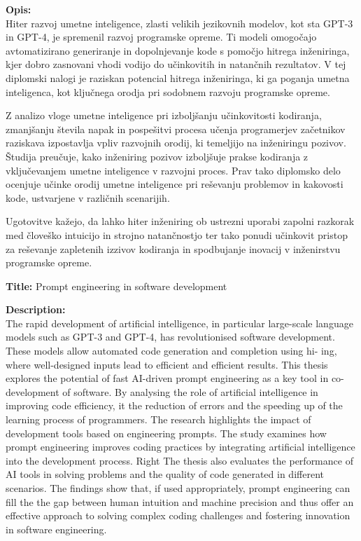 \documentclass[a4paper,12pt,openright]{book}
\newcommand{\ttitleEn}{Prompt engineering in software development}
\begin{document}
\bigskip
\noindent\textbf{Opis:}\\
Hiter razvoj umetne inteligence, zlasti velikih jezikovnih modelov, kot sta GPT-3 in GPT-4, je spremenil razvoj programske opreme. Ti modeli omogočajo avtomatizirano generiranje in dopolnjevanje kode s pomočjo hitrega inženiringa, kjer dobro zasnovani vhodi vodijo do učinkovitih in natančnih rezultatov. V tej diplomski nalogi je raziskan potencial hitrega inženiringa, ki ga poganja umetna inteligenca, kot ključnega orodja pri sodobnem razvoju programske opreme.

Z analizo vloge umetne inteligence pri izboljšanju učinkovitosti kodiranja, zmanjšanju števila napak in pospešitvi procesa učenja programerjev začetnikov raziskava izpostavlja vpliv razvojnih orodij, ki temeljijo na inženiringu pozivov. Študija preučuje, kako inženiring pozivov izboljšuje prakse kodiranja z vključevanjem umetne inteligence v razvojni proces. Prav tako diplomsko delo ocenjuje učinke orodij umetne inteligence pri reševanju problemov in kakovosti kode, ustvarjene v različnih scenarijih.

Ugotovitve kažejo, da lahko hiter inženiring ob ustrezni uporabi zapolni razkorak med človeško intuicijo in strojno natančnostjo ter tako ponudi učinkovit pristop za reševanje zapletenih izzivov kodiranja in spodbujanje inovacij v inženirstvu programske opreme.

\bigskip
\noindent\textbf{Title:} \ttitleEn

\bigskip
\noindent\textbf{Description:}\\
The rapid development of artificial intelligence, in particular large-scale language models such as
GPT-3 and GPT-4, has revolutionised software development. These models
allow automated code generation and completion using hi-
ing, where well-designed inputs lead to efficient and
efficient results. This thesis explores the potential of fast
AI-driven prompt engineering as a key tool in
co-development of software.
By analysing the role of artificial intelligence in improving code efficiency, it
the reduction of errors and the speeding up of the learning process of programmers.
The research highlights the impact of development tools based on
engineering prompts. The study examines how prompt engineering improves
coding practices by integrating artificial intelligence into the development process. Right
The thesis also evaluates the performance of AI tools in solving
problems and the quality of code generated in different scenarios.
The findings show that, if used appropriately, prompt engineering can fill the
the gap between human intuition and machine precision and thus offer an effective
approach to solving complex coding challenges and fostering innovation in
software engineering.
\end{document}
